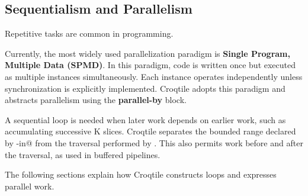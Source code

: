 \subsection*{Sequentialism and Parallelism}

Repetitive tasks are common in programming.

Currently, the most widely used parallelization paradigm is \textbf{Single Program, Multiple Data (SPMD)}. In this paradigm, code is written once but executed as multiple instances simultaneously. Each instance operates independently unless synchronization is explicitly implemented. Croqtile adopts this paradigm and abstracts parallelism using the \textbf{parallel-by} block.

A sequential loop is needed when later work depends on earlier work, such as accumulating successive K slices. Croqtile separates the bounded range declared by \co@with-in@ from the traversal performed by \co@foreach@. This also permits work before and after the traversal, as used in buffered pipelines.

The following sections explain how Croqtile constructs loops and expresses parallel work.
